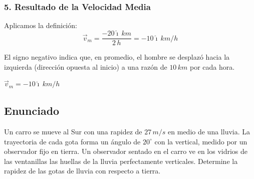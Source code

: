 \documentclass[12pt, a4paper]{article}
\begin{document}
\subsubsection*{5. Resultado de la Velocidad Media}

Aplicamos la definición:
\begin{equation}
    \vec{v}_m = \frac{-20 \hat{\imath} \, \si{km}}{2 \, \si{h}} = -10 \hat{\imath} \, \si{km/h}
\end{equation}

El signo negativo indica que, en promedio, el hombre se desplazó hacia la izquierda (dirección opuesta al inicio) a una razón de $10 \, \si{km}$ por cada hora.

\begin{tcolorbox}[colback=blue!5!white, colframe=blue!75!black, title=Respuesta Final]
\centering
\Large $\vec{v}_m = -10 \hat{\imath} \, \si{km/h}$
\end{tcolorbox}

\newpage

\subsection*{Enunciado}

Un carro se mueve al Sur con una rapidez de $27 \, \si{m/s}$ en medio de una lluvia. La trayectoria de cada gota forma un ángulo de $20^\circ$ con la vertical, medido por un observador fijo en tierra. Un observador sentado en el carro ve en los vidrios de las ventanillas las huellas de la lluvia perfectamente verticales. Determine la rapidez de las gotas de lluvia con respecto a tierra.

\begin{center}
\end{center}
\end{document}
